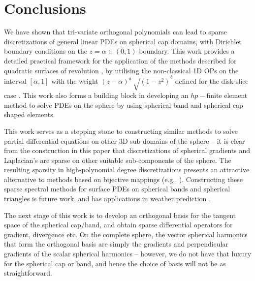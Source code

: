 \documentclass[11pt, oneside]{article}   	%
\begin{document}
%
\section{Conclusions}

We have shown that tri-variate orthogonal polynomials can lead to sparse discretizations of general linear PDEs on spherical cap domains, with Dirichlet boundary conditions on the $z = \alpha \in (0,1)$ boundary. This work provides a detailed practical framework for the application of the methods described for quadratic surfaces of revolution \cite{olver2020orthogonal}, by utilising the non-classical 1D OPs on the interval $[\alpha, 1]$ with the weight $(z - \alpha)^a \: \sqrt{(1-z^2)}^b$ defined for the disk-slice case \cite{snowball2019sparse}. This work also forms a building block in developing an $hp-$finite element method to solve PDEs on the sphere by using spherical band and spherical cap shaped elements.

This work serves as a stepping stone to constructing similar methods to solve partial differential equations on other 3D sub-domains of the sphere -- it is clear from the construction in this paper that discretizations of spherical gradients and Laplacian's are sparse on other suitable sub-components of the sphere. The resulting sparsity in high-polynomial degree discretizations presents an attractive alternative to methods based on bijective mappings (e.g., \cite{DGShallowWater,FEMShallowWater,boyd2005sphere}). Constructing these sparse spectral methods for surface PDEs on spherical bands and spherical triangles is future work, and has applications in weather prediction \cite{staniforth2012horizontal}.

The next stage of this work is to develop an orthogonal basis for the tangent space of the spherical cap/band, and obtain sparse differential operators for gradient, divergence etc. On the complete sphere, the vector spherical harmonics that form the orthogonal basis are simply the gradients and perpendicular gradients of the scalar spherical harmonics \cite{barrera1985vector} -- however, we do not have that luxury for the spherical cap or band, and hence the choice of basis will not be as straightforward.


\end{document}
